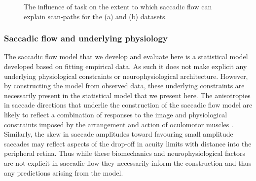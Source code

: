 \documentclass[a4paper, twocolumn, oneside, 11pt]{article}
\begin{document}
\begin{figure}
\centering
\caption{The influence of task on the extent to which saccadic flow can explain scan-paths for the (a) \cite{koehler2014} and (b) \cite{mills2011} datasets.}
\label{fig:taskLLH}
\end{figure}

\subsubsection{Saccadic flow and underlying physiology}
The saccadic flow model that we develop and evaluate here is a statistical model developed based on fitting empirical data. As such it does not make explicit any underlying physiological constraints or neurophysiological architecture. However, by constructing the model from observed data, these underlying constraints are necessarily present in the statistical model that we present here. The anisotropies in saccade directions that underlie the construction of the saccadic flow model are likely to reflect a combination of responses to the image and physiological constraints imposed by the arrangement and action of oculomotor muscles \cite{smit1987parametric,viviani1977curvature}. Similarly, the skew in saccade amplitudes toward favouring small amplitude saccades may reflect aspects of the drop-off in acuity limits with distance into the peripheral retina. Thus while these biomechanics and neurophysiological factors are not explicit in saccadic flow they necessarily inform the construction and thus any predictions arising from the model.
\end{document}
